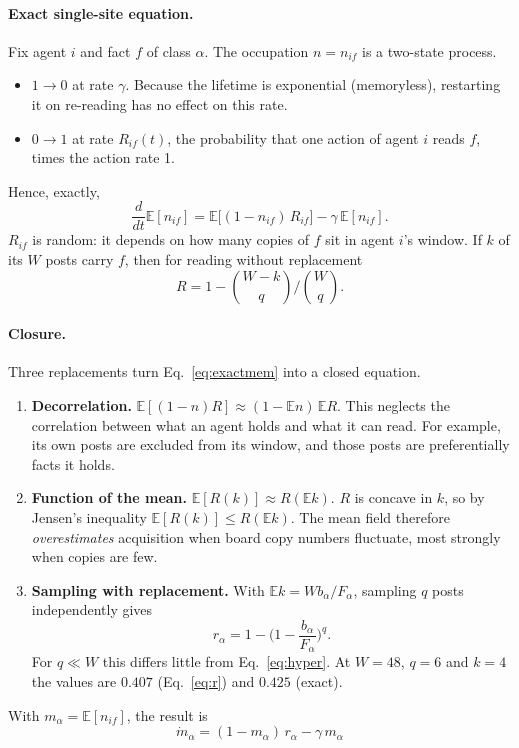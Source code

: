 \documentclass[10pt,a4paper]{article}
\theoremstyle{definition}
\newcommand{\E}{\mathbb E}
\begin{document}
\paragraph{Exact single-site equation.} Fix agent $i$ and fact $f$ of class $\alpha$. The occupation $n=n_{if}$ is a
two-state process.
\begin{itemize}
\item $1\to0$ at rate $\gamma$. Because the lifetime is exponential (memoryless), restarting it on re-reading has no
  effect on this rate.
\item $0\to1$ at rate $R_{if}(t)$, the probability that one action of agent $i$ reads $f$, times the action rate 1.
\end{itemize}
Hence, exactly,
\begin{equation}
\frac{d}{dt}\E[n_{if}]=\E\big[(1-n_{if})\,R_{if}\big]-\gamma\,\E[n_{if}].\label{eq:exactmem}
\end{equation}
$R_{if}$ is random: it depends on how many copies of $f$ sit in agent $i$'s window. If $k$ of its $W$ posts carry $f$,
then for reading without replacement
\begin{equation}
R=1-\binom{W-k}{q}\Big/\binom{W}{q}.\label{eq:hyper}
\end{equation}

\paragraph{Closure.} Three replacements turn Eq.~\eqref{eq:exactmem} into a closed equation.
\begin{enumerate}
\item \textbf{Decorrelation.} $\E[(1-n)R]\approx(1-\E n)\,\E R$. This neglects the correlation between what an agent
  holds and what it can read. For example, its own posts are excluded from its window, and those posts are
  preferentially facts it holds.
\item \textbf{Function of the mean.} $\E[R(k)]\approx R(\E k)$. $R$ is concave in $k$, so by Jensen's inequality
  $\E[R(k)]\le R(\E k)$. The mean field therefore \emph{overestimates} acquisition when board copy numbers fluctuate,
  most strongly when copies are few.
\item \textbf{Sampling with replacement.} With $\E k=Wb_\alpha/F_\alpha$, sampling $q$ posts independently gives
  \begin{equation}
  r_\alpha=1-\Big(1-\frac{b_\alpha}{F_\alpha}\Big)^{q}.\label{eq:r}
  \end{equation}
  For $q\ll W$ this differs little from Eq.~\eqref{eq:hyper}. At $W=48$, $q=6$ and $k=4$ the values are $0.407$
  (Eq.~\ref{eq:r}) and $0.425$ (exact).
\end{enumerate}
With $m_\alpha=\E[n_{if}]$, the result is
\begin{equation}
\boxed{\ \dot m_\alpha=(1-m_\alpha)\,r_\alpha-\gamma\,m_\alpha\ }\label{eq:1}
\end{equation}
\end{document}
